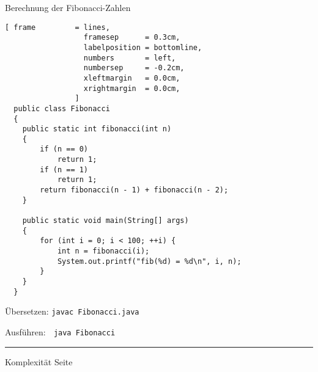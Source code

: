 \documentclass{slides}
\newcounter{mypage}
\begin{document}
\begin{slide}{}
 \begin{center}
 Berechnung der Fibonacci-Zahlen
 \end{center}

\footnotesize
\begin{Verbatim}[ frame         = lines, 
                  framesep      = 0.3cm, 
                  labelposition = bottomline,
                  numbers       = left,
                  numbersep     = -0.2cm,
                  xleftmargin   = 0.0cm,
                  xrightmargin  = 0.0cm,
                ]
  public class Fibonacci 
  {
    public static int fibonacci(int n) 
    {
        if (n == 0)
            return 1;
        if (n == 1)
            return 1;
        return fibonacci(n - 1) + fibonacci(n - 2);
    }
  
    public static void main(String[] args) 
    {
        for (int i = 0; i < 100; ++i) {
            int n = fibonacci(i);
            System.out.printf("fib(%d) = %d\n", i, n);
        }
    }   
  }
\end{Verbatim}

Übersetzen: \quad \texttt{javac Fibonacci.java}

Ausf\"uhren: \quad$\;$ \texttt{java Fibonacci}


\vspace*{\fill}
\tiny \addtocounter{mypage}{1}
\rule{17cm}{1mm}
Komplexit\"at  \hspace*{\fill} Seite 
\end{slide}

\end{document}

